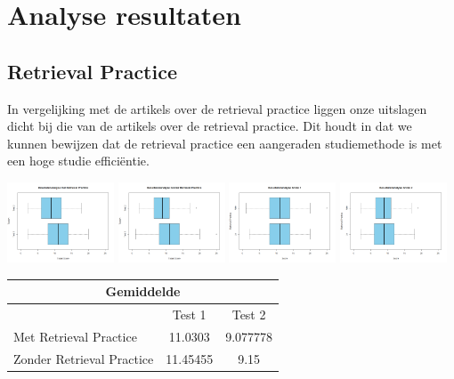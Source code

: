 \documentclass{hogent-article}
\begin{document}
	\section{Analyse resultaten} %
	\subsection{Retrieval Practice} 
	In vergelijking met de artikels over de retrieval practice \autocite{butler2010repeated, pyc2012test, karpicke2007repeated, karpicke2008critical} liggen onze uitslagen dicht bij die van de artikels over de retrieval practice. Dit houdt in dat we kunnen bewijzen dat de retrieval practice een aangeraden studiemethode is met een hoge studie efficiëntie.
	
	\includegraphics[width=120px]{Rplot_MetRetrievalPractice}
	\includegraphics[width=120px]{Rplot_ZonderRetrievalPractice}
	\includegraphics[width=120px]{Rplot_RetrievalPractice_Score1}
	\includegraphics[width=120px]{Rplot_RetrievalPractice_Score2}
	
	\begin{tabular}{ |p{10em}|c|c| }
		\hline
			\multicolumn{3}{|c|}{Gemiddelde} \\
		\hline
			& Test 1 & Test 2 \\
		\hline
			Met Retrieval Practice & 11.0303 & 9.077778 \\
			Zonder Retrieval Practice & 11.45455 & 9.15 \\
		\hline
	\end{tabular}
\end{document}
